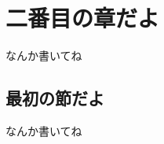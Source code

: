 \documentclass[index]{subfiles}
\begin{document}
\chapter{二番目の章だよ}
\label{ch:second}

なんか書いてね

\section{最初の節だよ}
\label{sec:second_first}

なんか書いてね
\end{document}
